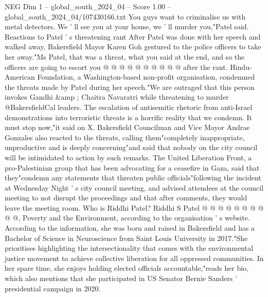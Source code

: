 \begin{textsample}{NEG Dim 1 – global\_south\_2024\_04 – Score 1.00 – global\_south\_2024\_04/107430166.txt}
You guys want to criminalise us with metal detectors.
We ' ll see you at your house, we ' ll murder you,"Patel said.
Reactions to Patel ' s threatening rant After Patel was done with her speech and walked away, Bakersfield Mayor Karen Goh gestured to the police officers to take her away."Ms Patel, that was a threat, what you said at the end, and so the officers are going to escort you @ @ @ @ @ @ @ @ @ @ after the rant.
Hindu-American Foundation, a Washington-based non-profit organisation, condemned the threats made by Patel during her speech."We are outraged that this person invokes Gandhi \&amp ; Chaitra Navaratri while threatening to murder @BakersfieldCal leaders.
The escalation of antisemitic rhetoric from anti-Israel demonstrations into terroristic threats is a horrific reality that we condemn.
It must stop now,"it said on X.
Bakersfield Councilman and Vice Mayor Andrae Gonzales also reacted to the threats, calling them"completely inappropriate, unproductive and is deeply concerning"and said that nobody on the city council will be intimidated to action by such remarks.
The United Liberation Front, a pro-Palestinian group that has been advocating for a ceasefire in Gaza, said that they"condemn any statements that threaten public officials"following the incident at Wednesday Night ' s city council meeting, and advised attendees at the council meeting to not disrupt the proceedings and that after comments, they would leave the meeting room.
Who is Riddhi Patel?
Riddhi S Patel @ @ @ @ @ @ @ @ @ @, Poverty and the Environment, according to the organisation ' s website.
According to the information, she was born and raised in Bakersfield and has a Bachelor of Science in Neuroscience from Saint Louis University in 2017."She prioritises highlighting the intersectionality that comes with the environmental justice movement to achieve collective liberation for all oppressed communities.
In her spare time, she enjoys holding elected officials accountable,"reads her bio, which also mentions that she participated in US Senator Bernie Sanders ' presidential campaign in 2020.

\end{textsample}
